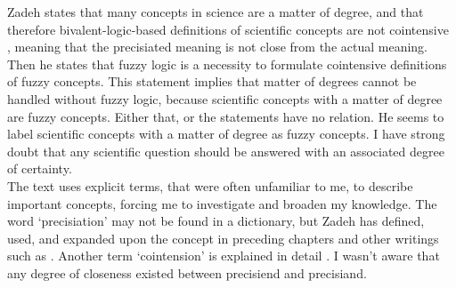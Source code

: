 Zadeh states that many concepts in science are a matter of degree, and that therefore bivalent-logic-based definitions of scientific concepts are not cointensive \cite[2769]{is_there_a_need_for_fuzzy_logic}, meaning that the precisiated meaning is not close from the actual meaning. Then he states that fuzzy logic is a necessity to formulate cointensive definitions of fuzzy concepts. This statement implies that matter of degrees cannot be handled without fuzzy logic, because scientific concepts with a matter of degree are fuzzy concepts. Either that, or the statements have no relation. He seems to label scientific concepts with a matter of degree as fuzzy concepts. I have strong doubt that any scientific question should be answered with an associated degree of certainty. \\


The text uses explicit terms, that were often unfamiliar to me, to describe important concepts, forcing me to investigate and broaden my knowledge. The word `precisiation' may not be found in a dictionary, but Zadeh has defined, used, and expanded upon the concept in preceding chapters and other writings such as \cite{concept_of_cointensive_precisiation}. Another term `cointension' is explained in detail \cite[2760]{is_there_a_need_for_fuzzy_logic}. I wasn't aware that any degree of closeness existed between precisiend and precisiand.


